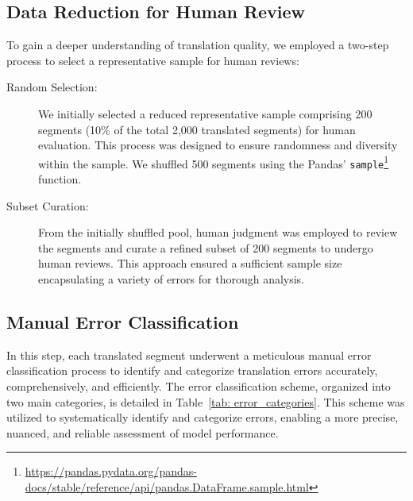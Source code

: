 \subsection{Data Reduction for Human Review}
To gain a deeper understanding of translation quality, we employed a two-step process to select a representative sample for human reviews:

\begin{description}
\item[Random Selection:] We initially selected a reduced representative sample comprising 200 segments (10\% of the total 2,000 translated segments) for human evaluation. This process was designed to ensure randomness and diversity within the sample. We shuffled 500 segments using the Pandas' \texttt{sample}\footnote{\href{https://pandas.pydata.org/pandas-docs/stable/reference/api/pandas.DataFrame.sample.html}{https://pandas.pydata.org/pandas-docs/stable/reference/api/pandas.DataFrame.sample.html}} function.
\item[Subset Curation:] From the initially shuffled pool, human judgment was employed to review the segments and curate a refined subset of 200 segments to undergo human reviews. This approach ensured a sufficient sample size encapsulating a variety of errors for thorough analysis.
\end{description}


\subsection{Manual Error Classification}
\label{subsec: Manual Error Classification}

In this step, each translated segment underwent a meticulous manual error classification process to identify and categorize translation errors accurately, comprehensively, and efficiently. The error classification scheme, organized into two main categories, is detailed in Table~\ref{tab: error_categories}. This scheme was utilized to systematically identify and categorize errors, enabling a more precise, nuanced, and reliable assessment of model performance.

